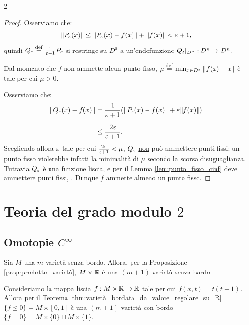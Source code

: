 \begin{multicols*}{2}
\begin{proof}
        Osserviamo che:
        \[
            \left\lVert P_\varepsilon(x) \right\rVert \leq \left\lVert P_\varepsilon(x) - f(x) \right\rVert + \left\lVert f(x) \right\rVert < \varepsilon + 1,
        \]
        quindi $Q_\varepsilon \overset{\mathrm{def}}{=} \frac{1}{\varepsilon + 1} P_\varepsilon$ si restringe su $D^n$ a
        un'endofunzione $Q_\varepsilon\arrowvert_{D^n} : D^n \to D^n$. \smallskip

        Dal momento che $f$ non ammette alcun punto fisso, $\mu \overset{\mathrm{def}}{=} \min_{x \in D^n} \left\lVert f(x) - x \right\rVert$ è
        tale per cui $\mu > 0$. \smallskip

        Osserviamo che:
        \begin{equation*}
            \begin{aligned}
                \|Q_\varepsilon(x) - f(x)\| & = \frac{1}{\varepsilon + 1} (\|P_\varepsilon(x) - f(x)\| + \varepsilon \|f(x)\|) \\[0.1in]
                                     & \leq \frac{2 \varepsilon}{\varepsilon + 1}.
            \end{aligned}
        \end{equation*}
        Scegliendo allora $\varepsilon$ tale per cui $\frac{2 \varepsilon}{\varepsilon + 1} < \mu$, $Q_\varepsilon$ \underline{non} può ammettere
        punti fissi: un punto fisso violerebbe infatti la minimalità di $\mu$ secondo la scorsa disuguaglianza.
        Tuttavia $Q_\varepsilon$ è una funzione liscia, e per il Lemma \ref{lem:punto_fisso_cinf} deve ammettere
        punti fissi, \Lightning. Dunque $f$ ammette almeno un punto fisso.
    \end{proof}

    \section{Teoria del grado modulo \texorpdfstring{$2$}{2}}

    \subsection{Omotopie \texorpdfstring{$C^\infty$}{C∞}}

    \begin{remark}
        Sia $M$ una $m$-varietà senza bordo. Allora, per la Proposizione \ref{prop:prodotto_varietà},
        $M \times \mathbb{R}$ è una $(m+1)$-varietà senza bordo. \smallskip

        Consideriamo la mappa liscia $f : M \times \mathbb{R} \to \mathbb{R}$ tale per cui
        $f(x, t) = t(t-1)$. Allora per il Teorema \ref{thm:varietà_bordata_da_valore_regolare_su_R}
        $\{f \leq 0\} = M \times [0, 1]$ è una $(m+1)$-varietà con bordo
        $\{f = 0\} = M \times \{0\} \sqcup M \times \{1\}$.
    \end{remark}


\end{multicols*}
